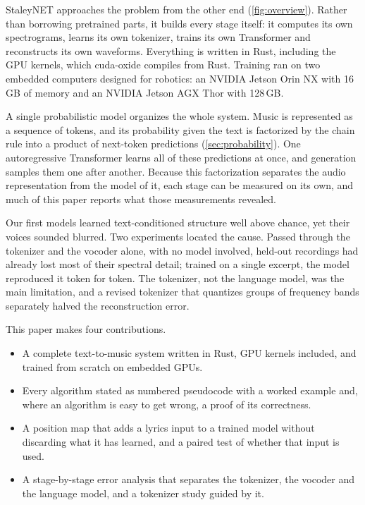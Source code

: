 StaleyNET approaches the problem from the other end (\cref{fig:overview}).
Rather than borrowing pretrained parts, it builds every stage itself: it
computes its own spectrograms, learns its own tokenizer, trains its own
Transformer and reconstructs its own waveforms. Everything is written in Rust,
including the GPU kernels, which cuda-oxide \cite{cudaoxide} compiles from Rust.
Training ran on two embedded computers designed for robotics: an NVIDIA Jetson
Orin NX with 16\,GB of memory and an NVIDIA Jetson AGX Thor with 128\,GB.

A single probabilistic model organizes the whole system. Music is represented
as a sequence of tokens, and its probability given the text is factorized by
the chain rule into a product of next-token predictions
(\cref{sec:probability}). One autoregressive Transformer learns all of these
predictions at once, and generation samples them one after another. Because
this factorization separates the audio representation from the model of it,
each stage can be measured on its own, and much of this paper reports what
those measurements revealed.

\begin{widefigure}
\resizebox{\linewidth}{!}{}
\caption{An overview of StaleyNET. During training (top row), a recording is
converted into a staircase of discrete tokens, which the Transformer learns
to predict from the caption and the lyrics. During generation (bottom row),
the Transformer produces tokens one step at a time, and the tokens are turned
back into sound.}
\label{fig:overview}
\end{widefigure}

Our first models learned text-conditioned structure well above chance, yet
their voices sounded blurred. Two experiments located the cause. Passed
through the tokenizer and the vocoder alone, with no model involved, held-out
recordings had already lost most of their spectral detail; trained on a single
excerpt, the model reproduced it token for token. The tokenizer, not the
language model, was the main limitation, and a revised tokenizer that
quantizes groups of frequency bands separately halved the reconstruction
error.

This paper makes four contributions.
\begin{itemize}[leftmargin=1.4em, itemsep=1pt]
\item A complete text-to-music system written in Rust, GPU kernels included,
  and trained from scratch on embedded GPUs.
\item Every algorithm stated as numbered pseudocode with a worked example and,
  where an algorithm is easy to get wrong, a proof of its correctness.
\item A position map that adds a lyrics input to a trained model without
  discarding what it has learned, and a paired test of whether that input is
  used.
\item A stage-by-stage error analysis that separates the tokenizer, the
  vocoder and the language model, and a tokenizer study guided by it.
\end{itemize}

